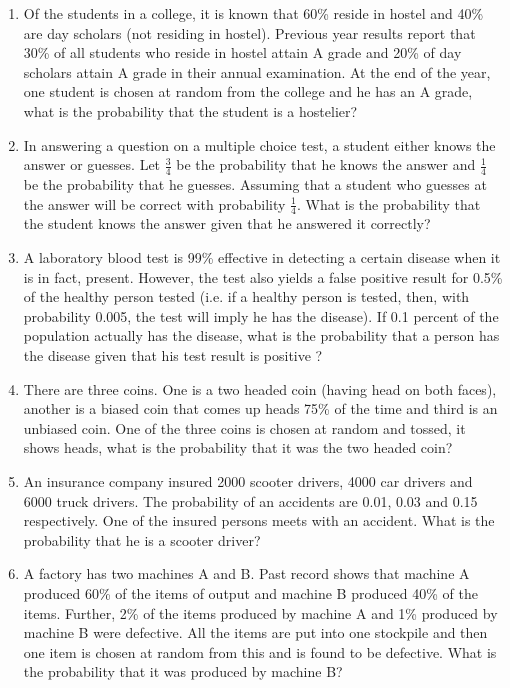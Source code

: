 \begin{enumerate}[label=\thesubsection.\arabic*,ref=\thesubsection.\theenumi]
		\label{ncert/12/13/3/2}
\item Of the students in a college, it is known that 60\% reside in hostel and 40\% are
day scholars (not residing in hostel). Previous year results report that 30\% of all
students who reside in hostel attain A grade and 20\% of day scholars attain A
grade in their annual examination. At the end of the year, one student is chosen
at random from the college and he has an A grade, what is the probability that the
student is a hostelier?     
		\label{ncert/12/13/3/3}
\\
\solution

\item In answering a question on a multiple choice test, a student either knows the
answer or guesses. Let
$\frac{3}{4}$ be the probability that he knows the answer and
$\frac{1}{4}$
be the probability that he guesses. Assuming that a student who guesses at the
answer will be correct with probability
$\frac{1}{4}$. What is the probability that the student knows the answer given that he answered it correctly?
\\
\solution

\item A laboratory blood test is 99\% effective in detecting a certain disease when it is
in fact, present. However, the test also yields a false positive result for 0.5\% of
the healthy person tested (i.e. if a healthy person is tested, then, with probability
0.005, the test will imply he has the disease). If 0.1 percent of the population
actually has the disease, what is the probability that a person has the disease
given that his test result is positive ?
\\
\solution

\item There are three coins. One is a two headed coin (having head on both faces),
another is a biased coin that comes up heads 75\% of the time and third is an
unbiased coin. One of the three coins is chosen at random and tossed, it shows
heads, what is the probability that it was the two headed coin?
%

\item An insurance company insured 2000 scooter drivers, 4000 car drivers and 6000
truck drivers. The probability of an accidents are 0.01, 0.03 and 0.15 respectively.
One of the insured persons meets with an accident. What is the probability that
he is a scooter driver?
\item A factory has two machines A and B. Past record shows that machine A produced
60\% of the items of output and machine B produced 40\% of the items. Further,
2\% of the items produced by machine A and 1\% produced by machine B were
defective. All the items are put into one stockpile and then one item is chosen at
random from this and is found to be defective. What is the probability that it was
produced by machine B?


\end{enumerate}
